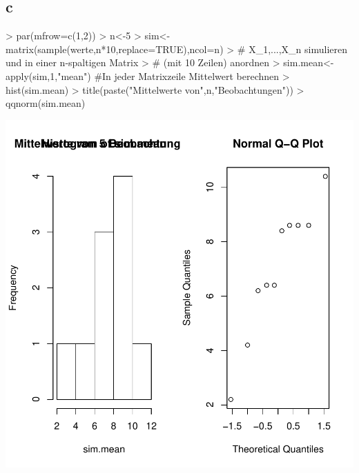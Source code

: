 \subsection{c}
\begin{Schunk}
\begin{Sinput}
> par(mfrow=c(1,2))
> n<-5
> sim<-matrix(sample(werte,n*10,replace=TRUE),ncol=n)
> # X_1,...,X_n simulieren und in einer n-spaltigen Matrix
> # (mit 10 Zeilen) anordnen
> sim.mean<- apply(sim,1,"mean") #In jeder Matrixzeile Mittelwert berechnen
> hist(sim.mean)
> title(paste("Mittelwerte von",n,"Beobachtungen"))
> qqnorm(sim.mean)
\end{Sinput}
\end{Schunk}
\includegraphics{sw08_4-003}

